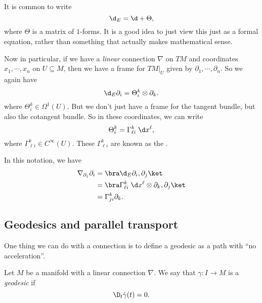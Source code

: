 \documentclass[a4paper]{article}
\begin{document}
It is common to write
\[
  \d_E = \d + \Theta,
\]
where $\Theta$ is a matrix of $1$-forms. It is a good idea to just view this just as a formal equation, rather than something that actually makes mathematical sense.

Now in particular, if we have a \emph{linear} connection $\nabla$ on $TM$ and coordinates $x_1, \cdots, x_n$ on $U \subseteq M$, then we have a frame for $TM|_U$ given by $\partial_1, \cdots, \partial_n$. So we again have
\[
  \d_E \partial_i = \Theta_i^k \otimes \partial_k.
\]
where $\Theta_i^k \in \Omega^1(U)$. But we don't just have a frame for the tangent bundle, but also the cotangent bundle. So in these coordinates, we can write
\[
  \Theta_i^k = \Gamma_{\ell i}^k\; \d x^\ell,
\]
where $\Gamma_{\ell i}^k \in C^\infty(U)$. These $\Gamma_{\ell i}^k$ are known as the .

In this notation, we have
\begin{align*}
  \nabla_{\partial_j} \partial_i &= \bra \d_E \partial_i, \partial_j\ket\\
  &= \bra \Gamma_{\ell i}^k \;\d x^\ell \otimes \partial_k, \partial_j\ket\\
  &= \Gamma^k_{ji} \partial_k.
\end{align*}

\subsection{Geodesics and parallel transport}
One thing we can do with a connection is to define a geodesic as a path with ``no acceleration''.
\begin{defi}[Geodesic]
  Let $M$ be a manifold with a linear connection $\nabla$. We say that $\gamma: I \to M$ is a \emph{geodesic} if
  \[
    \D_t \dot{\gamma}(t) = 0.
  \]
\end{defi}
\end{document}
